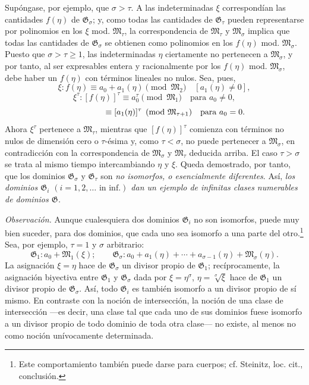 Supóngase, por ejemplo, que $\sigma>\tau$. A las indeterminadas $\xi$ correspondían las cantidades $f(\eta)$ de $\mathfrak G_\sigma$; y, como todas las cantidades de $\mathfrak G_\tau$ pueden representarse por polinomios en los $\xi$ mod. $\mathfrak M_\tau$, la correspondencia de $\mathfrak M_\tau$ y $\mathfrak M_\sigma$ implica que todas las cantidades de $\mathfrak G_\sigma$ se obtienen como polinomios en los $f(\eta)$ mod. $\mathfrak M_\sigma$. Puesto que $\sigma>\tau\ge1$, las indeterminadas $\eta$ ciertamente no pertenecen a $\mathfrak M_\sigma$, y por tanto, al ser expresables entera y racionalmente por los $f(\eta)$ mod. $\mathfrak M_\sigma$, debe haber un $f(\eta)$ con términos lineales no nulos. Sea, pues,
\[
 \xi:f(\eta)\equiv a_0+a_1(\eta)\pmod{\mathfrak M_2}\quad[a_1(\eta)\ne0],
\]
\[
 \xi^\tau:[f(\eta)]^\tau\equiv a_0^\tau\pmod{\mathfrak M_1}\quad\text{para }a_0\ne0,
\]
\[
 \hphantom{\xi^\tau:[f(\eta)]^\tau}\equiv [a_1(\eta)]^\tau
 \pmod{\mathfrak M_{\tau+1}}\quad\text{para }a_0=0.
\]
Ahora $\xi^\tau$ pertenece a $\mathfrak M_\tau$, mientras que $[f(\eta)]^\tau$ comienza con términos no nulos de dimensión cero o $\tau$-ésima y, como $\tau<\sigma$, no puede pertenecer a $\mathfrak M_\sigma$, en contradicción con la correspondencia de $\mathfrak M_\sigma$ y $\mathfrak M_\tau$ deducida arriba. El caso $\tau>\sigma$ se trata al mismo tiempo intercambiando $\eta$ y $\xi$. Queda demostrado, por tanto, que los dominios $\mathfrak G_\sigma$ y $\mathfrak G_\tau$ son \emph{no isomorfos, o esencialmente diferentes}. Así, \emph{los dominios $\mathfrak G_i$ $(i=1,2,\ldots\text{ in inf.})$ dan un ejemplo de infinitas clases numerables de dominios $\mathfrak G$.}

\emph{Observación.} Aunque cualesquiera dos dominios $\mathfrak G_i$ no son isomorfos, puede muy bien suceder, para dos dominios, que cada uno sea isomorfo a una parte del otro.\footnote{Este comportamiento también puede darse para cuerpos; cf. Steinitz, loc. cit., conclusión.} Sea, por ejemplo, $\tau=1$ y $\sigma$ arbitrario:
\[
\mathfrak G_1:a_0+\mathfrak M_1(\xi);\qquad
\mathfrak G_\sigma:a_0+a_1(\eta)+\cdots+a_{\sigma-1}(\eta)+\mathfrak M_\sigma(\eta).
\]
La asignación $\xi=\eta$ hace de $\mathfrak G_\sigma$ un divisor propio de $\mathfrak G_1$; recíprocamente, la asignación biyectiva entre $\mathfrak G_1$ y $\mathfrak G_\sigma$ dada por $\xi=\eta^\sigma$, $\eta=\sqrt[\sigma]{\xi}$ hace de $\mathfrak G_1$ un divisor propio de $\mathfrak G_\sigma$. Así, todo $\mathfrak G_i$ es también isomorfo a un divisor propio de sí mismo. En contraste con la noción de intersección, la noción de una clase de intersección ---es decir, una clase tal que cada uno de sus dominios fuese isomorfo a un divisor propio de todo dominio de toda otra clase--- no existe, al menos no como noción unívocamente determinada.

